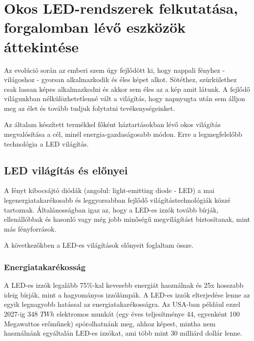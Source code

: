 \documentclass[../main.tex]{subfiles}
\begin{document}
\section{Okos LED-rendszerek felkutatása, forgalomban lévő eszközök áttekintése}
    Az evolúció során az emberi szem úgy fejlődött ki, hogy nappali fényhez - világoshoz - gyorsan alkalmazkodik és éles képet alkot. Sötéthez, szürkülethez csak lassan képes alkalmazkodni és akkor sem éles az a kép amit látunk. A fejlődő világunkban nélkülözhetetlenné vált a világítás, hogy napnyugta után sem álljon meg az élet és tovább tudjuk folytatni tevékenységeinket.
    
    
    Az általam készített termékkel főként háztartásokban lévő okos világítás megvalósítása a cél, minél energia-gazdaságosabb módon. Erre a legmegfelelőbb technológia a LED világítás\cite{a_energy_efficien_smart_led_systems}.
    
    \subsection{LED világítás és előnyei} 
    A fényt kibocsájtó diódák (angolul: light-emitting diode - LED) a mai legenergiatakarékosabb és leggyorsabban fejlődő világítástechnológiák közzé tartoznak. Általánosságban igaz az, hogy a LED-es izzók tovább bírják, ellenállóbbak és hasonló vagy még jobb minőségű megvilágítást biztosítanak, mint más fényforrások. \citep{led_lighting} 
    
    
    A következőkben a LED-es világítások előnyeit foglaltam össze.
        \subsubsection{Energiatakarékosság} 
            A LED-es izzók legalább 75\%-kal kevesebb energiát használnak és 25x hosszabb ideig bírják, mint a hagyományos izzólámpák. A LED-es izzók elterjedése lenne az egyik legnagyobb hatással az energiatakarékosságra. Az USA-ban például ezzel 2027-ig 348 $TWh$ elektromos munkát (egy éves teljesítménye 44, egyenként 100 Megawattos erőműnek) spórolhatnánk meg, ahhoz képest, mintha nem használnánk egyáltalán LED-es izzókat, ami több mint 30 milliárd dollár lenne.
            
\end{document}
